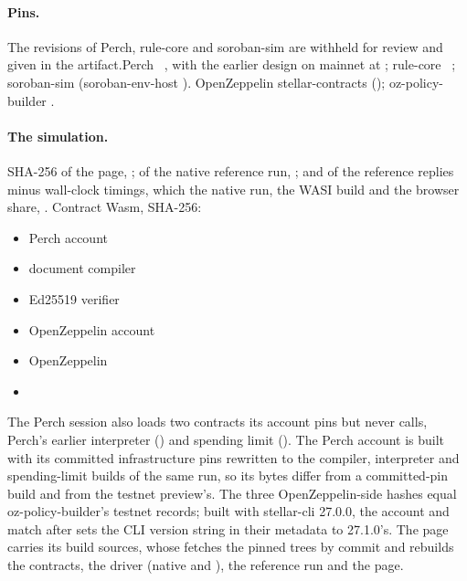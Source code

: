 \paragraph{Pins.} \ifdefined\anonymous The revisions of Perch, rule-core and
soroban-sim are withheld for review and given in the artifact.\else Perch
~, with the earlier design on mainnet at
; rule-core
~; soroban-sim
 (soroban-env-host
).\fi{} OpenZeppelin stellar-contracts
 (); oz-policy-builder
.

\paragraph{The simulation.} SHA-256 of the page, ; of
the native reference run, ; and of the reference
replies minus wall-clock timings, which the native run, the WASI build and the
browser share, . Contract Wasm, SHA-256:
{\footnotesize
\begin{itemize}[nosep,leftmargin=*]
\item Perch account 
\item document compiler 
\item Ed25519 verifier 
\item OpenZeppelin account 
\item OpenZeppelin  
\item {} 
\end{itemize}}
\noindent The Perch session also loads two contracts its account pins but never
calls, Perch's earlier interpreter () and
spending limit (). The Perch account is
built with its committed infrastructure pins rewritten to the compiler,
interpreter and spending-limit builds of the same run, so its bytes differ
from a committed-pin build and from the testnet preview's. The three
OpenZeppelin-side hashes equal oz-policy-builder's testnet records; built with
stellar-cli 27.0.0, the account and  match after
 sets the CLI version string in their metadata to
27.1.0's. The page carries its build sources, whose
 fetches the pinned trees by commit and rebuilds the contracts,
the driver (native and ), the reference run and the page.

